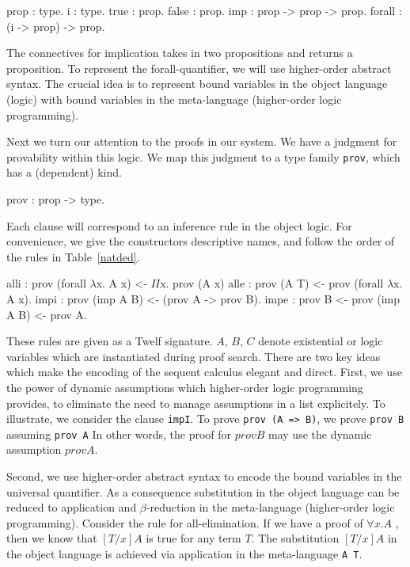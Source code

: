 \documentclass{acmconf}
\newcommand{\z}{\mbox{}}
\begin{document}
\begin{code}
prop : type.
i    : type.
\vspace{0.1in}
true   : prop.
false  : prop.
imp    : prop -> prop -> prop.
forall : (i -> prop) -> prop.
\end{code}

The connectives for implication takes in two propositions and returns a
proposition. To represent the forall-quantifier, we will use
higher-order abstract syntax. The crucial idea is to represent bound
variables in the object language (logic) with bound variables in the
meta-language (higher-order logic programming). 

Next we turn our attention to the proofs in our system. We have a
judgment for provability within this logic. We map this judgment to
a type family {\tt prov}, which has a (dependent) kind.

\begin{code}
prov : prop -> type.
\end{code}

Each clause will correspond to an inference rule in the object
logic. For convenience, we give the constructors 
descriptive names, and follow the order of the rules in
Table~\ref{natded}. 

\begin{code}
alli   : prov (forall $\lambda$x. A x)
            <- $\Pi$x. prov (A x)
alle   : prov (A T)
            <- prov (forall $\lambda$x. A x).
\z
impi     : prov (imp A B)
            <- (prov A -> prov B).
impe     : prov B
            <- prov (imp A B)
            <- prov A.
\end{code}


These rules are given as a Twelf signature. $A$, $B$, $C$ denote
existential or logic variables which are instantiated during proof
search.  
There are two key ideas which make the encoding of the sequent
calculus elegant and direct. First, we use the power of dynamic
assumptions which higher-order logic programming provides, to
eliminate the need to manage assumptions in a list explicitely. To
illustrate, we consider the clause {\tt impI}. To  prove {\tt prov (A
  => B)}, we prove {\tt prov B} assuming {\tt prov A} In other words,
the proof for $prov B$ may use the dynamic assumption $prov A$. 

Second, we use higher-order abstract syntax to encode the bound
variables in the universal quantifier. As a consequence substitution
in the object language can be reduced to application and
$\beta$-reduction in the meta-language (higher-order logic
programming). Consider the rule for all-elimination. If we have a proof of
$\forall x.A$ , then we know that $[T/x]A$ is true for any term
$T$. The substitution $[T/x]A$ in the object language is achieved via
application in the meta-language {\tt A T}. 
\end{document}
